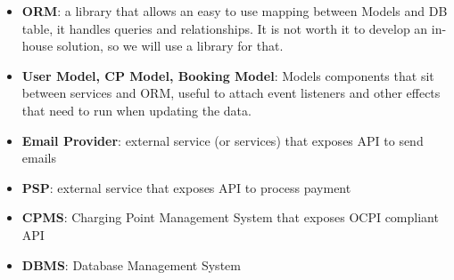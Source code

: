 \begin{itemize}
	\item \textbf{ORM}: a library that allows an easy to use mapping between Models and DB table, it handles queries and relationships. It is not worth it to develop an in-house solution, so we will use a library for that.
	\item \textbf{User Model, CP Model, Booking Model}: Models components that sit between services and ORM, useful to attach event listeners and other effects that need to run when updating the data. 
	\item \textbf{Email Provider}: external service (or services) that exposes API to send emails
	\item \textbf{PSP}: external service that exposes API to process payment
	\item \textbf{CPMS}: Charging Point Management System that exposes OCPI compliant API
	\item \textbf{DBMS}: Database Management System
\end{itemize}




















